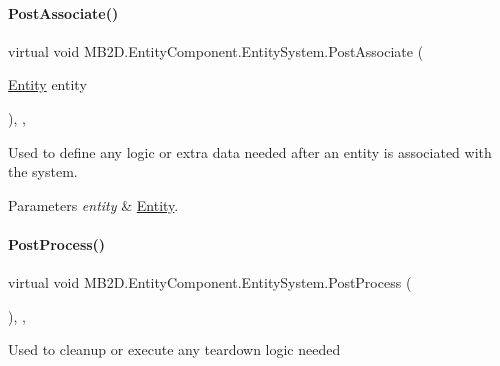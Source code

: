 \paragraph{\texorpdfstring{Post\+Associate()}{PostAssociate()}}
{\footnotesize\ttfamily virtual void M\+B2\+D.\+Entity\+Component.\+Entity\+System.\+Post\+Associate (\begin{DoxyParamCaption}\item[{\hyperlink{class_m_b2_d_1_1_entity_component_1_1_entity}{Entity}}]{entity }\end{DoxyParamCaption})\hspace{0.3cm}{\ttfamily [inline]}, {\ttfamily [protected]}, {\ttfamily [virtual]}}



Used to define any logic or extra data needed after an entity is associated with the system. 


\begin{DoxyParams}{Parameters}
{\em entity} & \hyperlink{class_m_b2_d_1_1_entity_component_1_1_entity}{Entity}.\\
\hline
\end{DoxyParams}
\hypertarget{class_m_b2_d_1_1_entity_component_1_1_entity_system_aa215c796a01092b66eb70c5726dfac75}{}\label{class_m_b2_d_1_1_entity_component_1_1_entity_system_aa215c796a01092b66eb70c5726dfac75} 
\paragraph{\texorpdfstring{Post\+Process()}{PostProcess()}}
{\footnotesize\ttfamily virtual void M\+B2\+D.\+Entity\+Component.\+Entity\+System.\+Post\+Process (\begin{DoxyParamCaption}{ }\end{DoxyParamCaption})\hspace{0.3cm}{\ttfamily [inline]}, {\ttfamily [protected]}, {\ttfamily [virtual]}}



Used to cleanup or execute any teardown logic needed 

\hypertarget{class_m_b2_d_1_1_entity_component_1_1_entity_system_aadc002dd04d9cb75775ca955a28e303e}{}\label{class_m_b2_d_1_1_entity_component_1_1_entity_system_aadc002dd04d9cb75775ca955a28e303e} 
